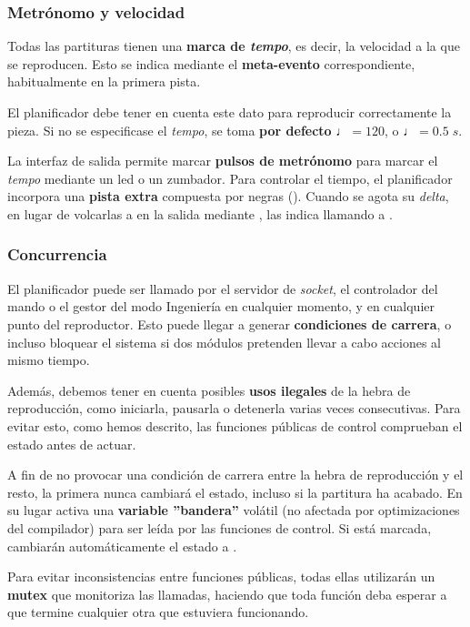 \subsubsection{Metrónomo y velocidad}

Todas las partituras tienen una \textbf{marca de \textit{tempo}}, es decir, la velocidad a la que se reproducen. Esto se indica mediante el \textbf{meta-evento} correspondiente, habitualmente en la primera pista.

El planificador debe tener en cuenta este dato para reproducir correctamente la pieza. Si no se especificase el \textit{tempo}, se toma \textbf{por defecto} $\quarternote=120$, o $\quarternote=0.5 \;s$.

La interfaz de salida permite marcar \textbf{pulsos de metrónomo} para marcar el \textit{tempo} mediante un \acrshort{led} o un zumbador. Para controlar el tiempo, el planificador incorpora una \textbf{pista extra} compuesta por negras (\quarternote). Cuando se agota su \textit{delta}, en lugar de volcarlas a en la salida mediante , las indica llamando a .

\subsubsection{Concurrencia}

El planificador puede ser llamado por el servidor de \textit{socket}, el controlador del mando o el gestor del modo Ingeniería en cualquier momento, y en cualquier punto del reproductor. Esto puede llegar a generar \textbf{condiciones de carrera}, o incluso bloquear el sistema si dos módulos pretenden llevar a cabo acciones al mismo tiempo.

Además, debemos tener en cuenta posibles \textbf{usos ilegales} de la hebra de reproducción, como iniciarla, pausarla o detenerla varias veces consecutivas. Para evitar esto, como hemos descrito, las funciones públicas de control comprueban el estado antes de actuar.

A fin de no provocar una condición de carrera entre la hebra de reproducción y el resto, la primera nunca cambiará el estado, incluso si la partitura ha acabado. En su lugar activa una \textbf{variable ''bandera''} volátil (no afectada por optimizaciones del compilador) para ser leída por las funciones de control. Si está marcada, cambiarán automáticamente el estado a .

Para evitar inconsistencias entre funciones públicas, todas ellas utilizarán un \textbf{\acrshort{mutex}} que monitoriza las llamadas, haciendo que toda función deba esperar a que termine cualquier otra que estuviera funcionando.

